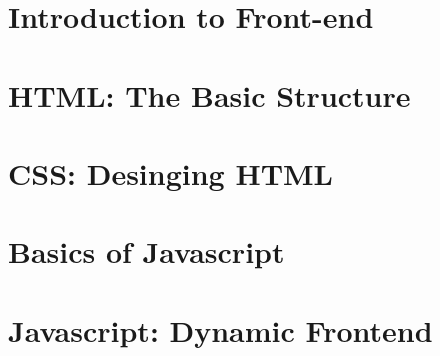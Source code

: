 \documentclass[a4paper,10pt,hidelinks]{report}
\begin{document}
    
    \dominitoc
    {\doublespacing\tableofcontents}

    \chapter{Introduction to Front-end} \label{ch:intoduction-to-front-end}
    \minitoc
    
    
    

    \chapter{HTML: The Basic Structure} \label{ch:html-the-basic-structure}
    \minitoc
    
    
    
    
    

    \chapter{CSS: Desinging HTML} \label{ch:css-designing-html}
    \minitoc
    
    
    
    
    
    
    

    \chapter{Basics of Javascript} \label{ch:basics-of-javascript}
    \minitoc
    
    
    
    
    
    

    \chapter{Javascript: Dynamic Frontend} \label{ch:javascript-dynamic-frontend}
    \minitoc
    
    
    
    
    
\end{document}
